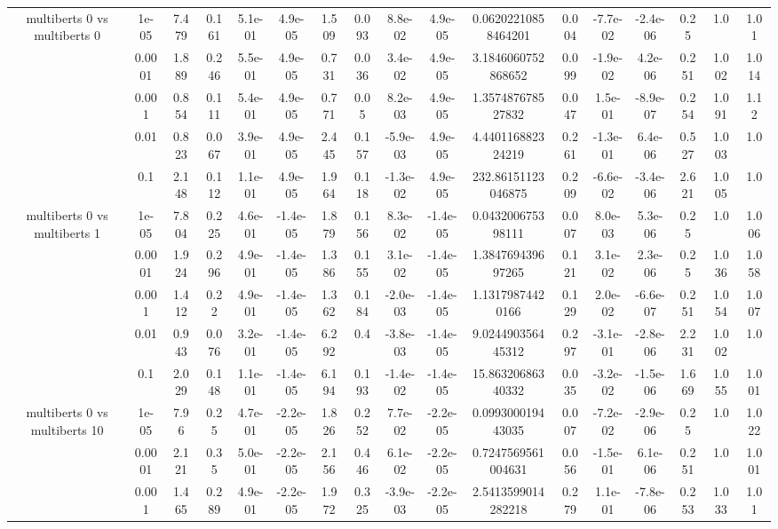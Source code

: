 \begin{tabular}{|c|c|c|c|c|c|c|c|c|c|c|c|c|c|c|c|c|}
\hline
\multirow{5}{*}{multiberts 0 vs multiberts 0} & 1e-05 & 7.479 & 0.161 & 5.1e-01 & 4.9e-05 & 1.509 & 0.093 & 8.8e-02 & 4.9e-05 & 0.06202210858464201 & 0.004 & -7.7e-02 & -2.4e-06 & 0.25 & 1.0 & 1.01 \\
 & 0.0001 & 1.889 & 0.246 & 5.5e-01 & 4.9e-05 & 0.731 & 0.036 & 3.4e-02 & 4.9e-05 & 3.1846060752868652 & 0.099 & -1.9e-02 & 4.2e-06 & 0.251 & 1.002 & 1.014 \\
 & 0.001 & 0.854 & 0.111 & 5.4e-01 & 4.9e-05 & 0.771 & 0.05 & 8.2e-03 & 4.9e-05 & 1.357487678527832 & 0.047 & 1.5e-01 & -8.9e-07 & 0.254 & 1.091 & 1.12 \\
 & 0.01 & 0.823 & 0.067 & 3.9e-01 & 4.9e-05 & 2.445 & 0.157 & -5.9e-03 & 4.9e-05 & 4.440116882324219 & 0.261 & -1.3e-01 & 6.4e-06 & 0.527 & 1.003 & 1.0 \\
 & 0.1 & 2.148 & 0.112 & 1.1e-01 & 4.9e-05 & 1.964 & 0.118 & -1.3e-02 & 4.9e-05 & 232.86151123046875 & 0.209 & -6.6e-02 & -3.4e-06 & 2.621 & 1.005 & 1.0 \\
\hline
\multirow{5}{*}{multiberts 0 vs multiberts 1} & 1e-05 & 7.804 & 0.225 & 4.6e-01 & -1.4e-05 & 1.879 & 0.156 & 8.3e-02 & -1.4e-05 & 0.043200675398111 & 0.007 & 8.0e-03 & 5.3e-06 & 0.25 & 1.0 & 1.006 \\
 & 0.0001 & 1.924 & 0.296 & 4.9e-01 & -1.4e-05 & 1.386 & 0.155 & 3.1e-02 & -1.4e-05 & 1.384769439697265 & 0.121 & 3.1e-02 & 2.3e-06 & 0.25 & 1.036 & 1.058 \\
 & 0.001 & 1.412 & 0.22 & 4.9e-01 & -1.4e-05 & 1.362 & 0.184 & -2.0e-03 & -1.4e-05 & 1.13179874420166 & 0.129 & 2.0e-02 & -6.6e-07 & 0.251 & 1.054 & 1.007 \\
 & 0.01 & 0.943 & 0.076 & 3.2e-01 & -1.4e-05 & 6.292 & 0.4 & -3.8e-03 & -1.4e-05 & 9.024490356445312 & 0.297 & -3.1e-01 & -2.8e-06 & 2.231 & 1.002 & 1.0 \\
 & 0.1 & 2.029 & 0.148 & 1.1e-01 & -1.4e-05 & 6.194 & 0.193 & -1.4e-02 & -1.4e-05 & 15.86320686340332 & 0.035 & -3.2e-02 & -1.5e-06 & 1.669 & 1.055 & 1.001 \\
\hline
\multirow{5}{*}{multiberts 0 vs multiberts 10} & 1e-05 & 7.96 & 0.25 & 4.7e-01 & -2.2e-05 & 1.826 & 0.252 & 7.7e-02 & -2.2e-05 & 0.099300019443035 & 0.007 & -7.2e-02 & -2.9e-06 & 0.25 & 1.0 & 1.022 \\
 & 0.0001 & 2.121 & 0.35 & 5.0e-01 & -2.2e-05 & 2.156 & 0.446 & 6.1e-02 & -2.2e-05 & 0.7247569561004631 & 0.056 & -1.5e-01 & 6.1e-06 & 0.251 & 1.0 & 1.001 \\
 & 0.001 & 1.465 & 0.289 & 4.9e-01 & -2.2e-05 & 1.972 & 0.325 & -3.9e-03 & -2.2e-05 & 2.5413599014282218 & 0.279 & 1.1e-01 & -7.8e-06 & 0.253 & 1.033 & 1.01 \\

\end{tabular}
